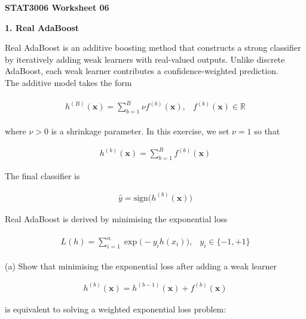 \documentclass[11pt]{article}
\begin{document}
    \begin{center}
        \Large \textbf{STAT3006 Worksheet 06}
    \end{center}

    \Large \textbf{1. Real AdaBoost}

    \large Real AdaBoost is an additive boosting method that constructs a strong classifier by 
    iteratively
    adding weak learners with real-valued outputs. Unlike discrete AdaBoost, each weak learner
    contributes a confidence-weighted prediction. \\ 

    The additive model takes the form 

    \begin{align*}
        \begin{matrix}
            h^{(B)}(\mathbf{x}) = \sum_{b = 1}^B \nu f^{(b)}(\mathbf{x}),
            & f^{(b)}(\mathbf{x}) \in \mathbb{R}
        \end{matrix}
    \end{align*}

    where $\nu > 0$ is a shrinkage parameter. In this exercise, we set $\nu = 1$ so that 

    \begin{align*}
        h^{(b)}(\mathbf{x}) = \sum_{b = 1}^B f^{(b)}(\mathbf{x})
    \end{align*}

    The final classifier is 

    \begin{align*}
        \hat{y} = \text{sign}\bigg(h^{(b)}(\mathbf{x})\bigg)
    \end{align*}

    Real AdaBoost is derived by minimising the exponential loss

    \begin{align*}
        \begin{matrix}
        L(h) = \sum_{i = 1}^n \exp\bigg(-y_i h(x_i)\bigg),
        & y_i \in \{-1, +1 \}
        \end{matrix}
    \end{align*}

    (a) Show that minimising the exponential loss after adding a weak learner 

    \begin{align*}
        h^{(b)}(\mathbf{x}) = h^{(b - 1)}(\mathbf{x}) + f^{(b)}(\mathbf{x})
    \end{align*}

    is equivalent to solving a weighted exponential loss problem: 
\end{document}
